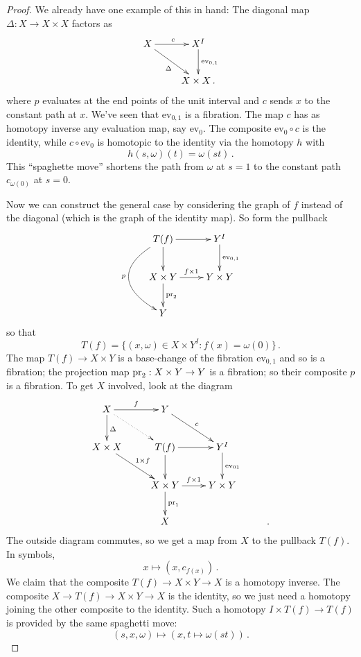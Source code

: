 \begin{proof}
We already have one example of this in hand: The diagonal map 
$\Delta:X\to X\times X$ factors as 
    \begin{equation*}
	\xymatrix{
	    X\ar[r]^{c}\ar[dr]_\Delta & X^I\ar[d]^{\mathrm{ev}_{0,1}}\\
	    & X\times X\,.
	    }
    \end{equation*}
where $p$ evaluates at the end points of the unit interval and $c$ sends
$x$ to the constant path at $x$. We've seen that $\mathrm{ev}_{0,1}$ 
is a fibration.
The map $c$ has as homotopy inverse any evaluation map, say $\mathrm{ev}_0$.
The composite $\mathrm{ev}_0\circ c$ is the identity, while 
$c\circ\mathrm{ev}_0$ is homotopic to the identity via the homotopy $h$ with
\[
h(s,\omega)(t)=\omega(st)\,.
\]
This ``spaghette move'' shortens the path from $\omega$ at $s=1$ to the 
constant path $c_{\omega(0)}$ at $s=0$. 

Now we can construct the general case by considering the graph of $f$ instead 
of the diagonal (which is the graph of the identity map). So form the pullback
	\begin{equation*}
	    \xymatrix{
T(f)\ar[r]\ar[d] \ar@/_3pc/[dd]_p & Y^I\ar[d]^{\mathrm{ev}_{0,1}}\\
		    X\times Y\ar[r]^{f\times 1} \ar[d]^{\pr_2} & Y\times Y\\
Y & 
		}
	\end{equation*}
so that
\[
T(f)=\{(x,\omega)\in X\times Y^I:f(x) = \omega(0)\}\,.
\]
The map $T(f)\to X\times Y$ 
is a base-change of the fibration $\mathrm{ev}_{0,1}$ and so is
a fibration; the projection map $\mathrm{pr}_2:X\times Y\to Y$ is a fibration; so
their composite $p$ is a fibration. To get $X$ involved, look at the diagram
\[
\xymatrix{
X \ar[r]^f \ar[d]^\Delta \ar@{.>}[dr] & Y \ar[dr]^c \\
X\times X \ar[dr]^{1\times f} & T(f) \ar[r] \ar[d] & 
Y^I \ar[d]^{\mathrm{ev}_{01}} \\
& X\times Y \ar[r]^{f\times1} \ar[d]^{\pr_1} & Y\times Y\\
& X && \,.
}\]
The outside diagram commutes, so we get a map from $X$ to the pullback $T(f)$. 
In symbols,
\[
x\mapsto(x,c_{f(x)})\,.
\]
We claim that the composite  $T(f)\to X\times Y\to X$ is a homotopy inverse. 
The composite $X\to T(f)\to X\times Y\to X$ is the identity, so we just need
a homotopy joining the other composite to the identity. Such a homotopy
$I\times T(f)\to T(f)$ is provided by the same spaghetti move: 
\[
(s,x,\omega)\mapsto(x,t\mapsto\omega(st))\,.
\]
\end{proof}

